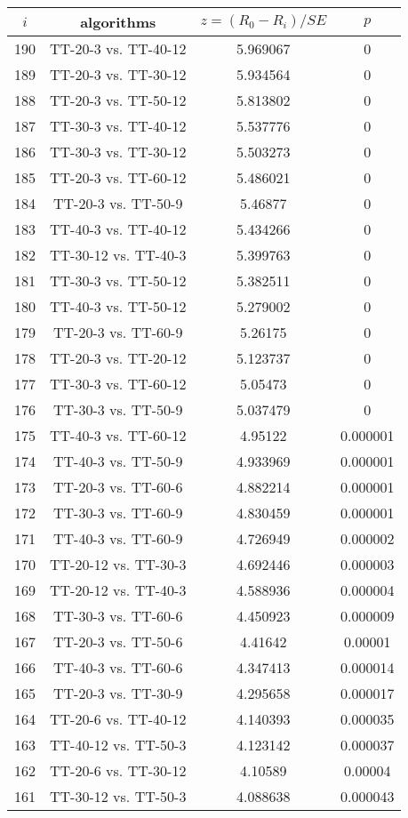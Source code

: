 \documentclass[a4paper,10pt]{article}
\begin{document}
\begin{landscape}
\begin{table}[!htp]
\centering\scriptsize
\begin{tabular}{cccc}
$i$&algorithms&$z=(R_0 - R_i)/SE$&$p$\\
\hline190&TT-20-3 vs. TT-40-12&5.969067&0\\
189&TT-20-3 vs. TT-30-12&5.934564&0\\
188&TT-20-3 vs. TT-50-12&5.813802&0\\
187&TT-30-3 vs. TT-40-12&5.537776&0\\
186&TT-30-3 vs. TT-30-12&5.503273&0\\
185&TT-20-3 vs. TT-60-12&5.486021&0\\
184&TT-20-3 vs. TT-50-9&5.46877&0\\
183&TT-40-3 vs. TT-40-12&5.434266&0\\
182&TT-30-12 vs. TT-40-3&5.399763&0\\
181&TT-30-3 vs. TT-50-12&5.382511&0\\
180&TT-40-3 vs. TT-50-12&5.279002&0\\
179&TT-20-3 vs. TT-60-9&5.26175&0\\
178&TT-20-3 vs. TT-20-12&5.123737&0\\
177&TT-30-3 vs. TT-60-12&5.05473&0\\
176&TT-30-3 vs. TT-50-9&5.037479&0\\
175&TT-40-3 vs. TT-60-12&4.95122&0.000001\\
174&TT-40-3 vs. TT-50-9&4.933969&0.000001\\
173&TT-20-3 vs. TT-60-6&4.882214&0.000001\\
172&TT-30-3 vs. TT-60-9&4.830459&0.000001\\
171&TT-40-3 vs. TT-60-9&4.726949&0.000002\\
170&TT-20-12 vs. TT-30-3&4.692446&0.000003\\
169&TT-20-12 vs. TT-40-3&4.588936&0.000004\\
168&TT-30-3 vs. TT-60-6&4.450923&0.000009\\
167&TT-20-3 vs. TT-50-6&4.41642&0.00001\\
166&TT-40-3 vs. TT-60-6&4.347413&0.000014\\
165&TT-20-3 vs. TT-30-9&4.295658&0.000017\\
164&TT-20-6 vs. TT-40-12&4.140393&0.000035\\
163&TT-40-12 vs. TT-50-3&4.123142&0.000037\\
162&TT-20-6 vs. TT-30-12&4.10589&0.00004\\
161&TT-30-12 vs. TT-50-3&4.088638&0.000043\\

\end{tabular}
\end{table}
\end{landscape}
\end{document}
